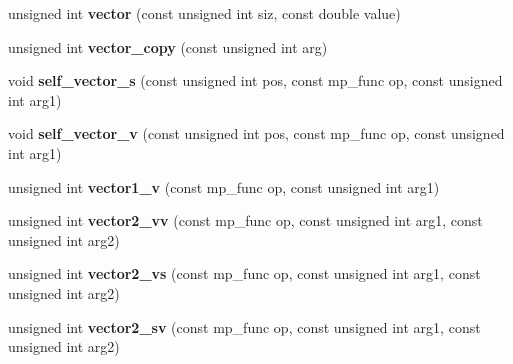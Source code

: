 \begin{DoxyCompactItemize}
unsigned int {\bfseries vector} (const unsigned int siz, const double value)
\item 
\mbox{\label{structcimg__library__suffixed_1_1CImg_1_1__cimg__math__parser_a7d9b5b35459bcc94ea2fd2c265b32123}} 
unsigned int {\bfseries vector\+\_\+copy} (const unsigned int arg)
\item 
\mbox{\label{structcimg__library__suffixed_1_1CImg_1_1__cimg__math__parser_aad42f4efe4a29c92c651b44879c639f5}} 
void {\bfseries self\+\_\+vector\+\_\+s} (const unsigned int pos, const mp\+\_\+func op, const unsigned int arg1)
\item 
\mbox{\label{structcimg__library__suffixed_1_1CImg_1_1__cimg__math__parser_ab0821949940cfb53f3ddfa5e39e3ca6d}} 
void {\bfseries self\+\_\+vector\+\_\+v} (const unsigned int pos, const mp\+\_\+func op, const unsigned int arg1)
\item 
\mbox{\label{structcimg__library__suffixed_1_1CImg_1_1__cimg__math__parser_aa7cca47d009b3663c2a14aa9307d2ba1}} 
unsigned int {\bfseries vector1\+\_\+v} (const mp\+\_\+func op, const unsigned int arg1)
\item 
\mbox{\label{structcimg__library__suffixed_1_1CImg_1_1__cimg__math__parser_a930d4d9bb7ea4f7f64283e60f7722139}} 
unsigned int {\bfseries vector2\+\_\+vv} (const mp\+\_\+func op, const unsigned int arg1, const unsigned int arg2)
\item 
\mbox{\label{structcimg__library__suffixed_1_1CImg_1_1__cimg__math__parser_af3073ae1f236be6068d46c7651a2c2d6}} 
unsigned int {\bfseries vector2\+\_\+vs} (const mp\+\_\+func op, const unsigned int arg1, const unsigned int arg2)
\item 
\mbox{\label{structcimg__library__suffixed_1_1CImg_1_1__cimg__math__parser_a149ded260ecf0cef762feaa47e827077}} 
unsigned int {\bfseries vector2\+\_\+sv} (const mp\+\_\+func op, const unsigned int arg1, const unsigned int arg2)

\end{DoxyCompactItemize}
